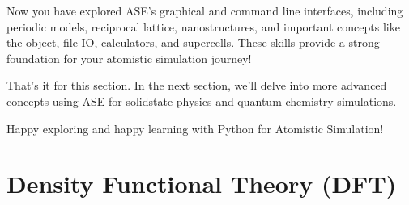 \documentclass[letterpaper,10pt,english]{sphinxmanual}
\begin{document}
\sphinxAtStartPar
Now you have explored ASE’s graphical and command line interfaces, including periodic models, reciprocal lattice, nanostructures, and important concepts like the  object, file IO, calculators, and supercells. These skills provide a strong foundation for your atomistic simulation journey!

\sphinxAtStartPar
That’s it for this section. In the next section, we’ll delve into more advanced concepts using ASE for solid\sphinxhyphen{}state physics and quantum chemistry simulations.

\sphinxAtStartPar
Happy exploring and happy learning with Python for Atomistic Simulation!

\sphinxstepscope


\chapter{Density Functional Theory (DFT)}
\label{\detokenize{dft/dft:density-functional-theory-dft}}\label{\detokenize{dft/dft::doc}}
\end{document}
